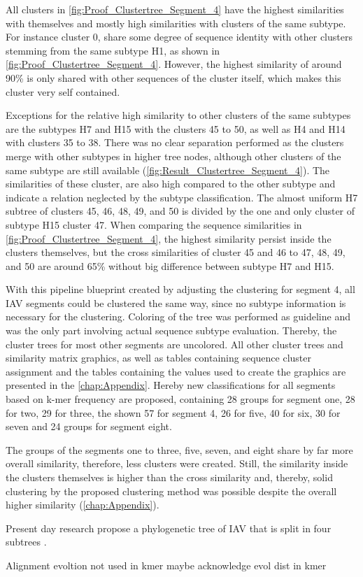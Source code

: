All clusters in \autoref{fig:Proof_Clustertree_Segment_4} have the highest similarities with themselves and mostly high similarities with clusters of the same subtype. For instance cluster 0, share some degree of sequence identity with other clusters stemming from the same subtype H1, as shown in \autoref{fig:Proof_Clustertree_Segment_4}. However, the highest similarity of around 90\% is only shared with other sequences of the cluster itself, which makes this cluster very self contained. 

\vspace{1em}

Exceptions for the relative high similarity to other clusters of the same subtypes are the subtypes H7 and H15 with the clusters 45 to 50, as well as H4 and H14 with clusters 35 to 38. There was no clear separation performed as the clusters merge with other subtypes in higher tree nodes, although other clusters of the same subtype are still available (\autoref{fig:Result_Clustertree_Segment_4}). The similarities of these cluster, are also high compared to the other subtype and indicate a relation neglected by the subtype classification. The almost uniform H7 subtree of clusters 45, 46, 48, 49, and 50 is divided by the one and only cluster of subtype H15 cluster 47. When comparing the sequence similarities in \autoref{fig:Proof_Clustertree_Segment_4}, the highest similarity persist inside the clusters themselves, but the cross similarities of cluster 45 and 46 to 47, 48, 49, and 50 are around 65\% without big difference between subtype H7 and H15.  

\vspace{1em}

With this pipeline blueprint created by adjusting the clustering for segment 4, all \gls{IAV} segments could be clustered the same way, since no subtype information is necessary for the clustering. Coloring of the tree was performed as guideline and was the only part involving actual sequence subtype evaluation. Thereby, the cluster trees for most other segments are uncolored. All other cluster trees and similarity matrix graphics, as well as tables containing sequence cluster assignment and the tables containing the values used to create the graphics are presented in the \autoref{chap:Appendix}. Hereby new classifications for all segments based on k-mer frequency are proposed, containing 28 groups for segment one, 28 for two, 29 for three, the shown 57 for segment 4, 26 for five, 40 for six, 30 for seven and 24 groups for segment eight. 

\vspace{1em}

The groups of the segments one to three, five, seven, and eight share by far more overall similarity, therefore, less clusters were created. Still, the similarity inside the clusters themselves is higher than the cross similarity and, thereby, solid clustering by the proposed clustering method was possible despite the overall higher similarity (\autoref{chap:Appendix}). 

Present day research propose a phylogenetic tree of \gls{IAV} that is split in four subtrees \autocite{wei_next-generation_2020}. 

Alignment evoltion not used in kmer maybe acknowledge evol dist in kmer 